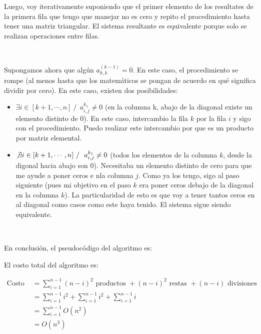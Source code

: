 \documentclass[]{article}
\begin{document}
Luego, voy iterativamente suponiendo que el primer elemento de los resultates de la primera fila que tengo que manejar no es cero y repito el procedimiento hasta tener una matriz triangular. El sistema resultante es equivalente porque solo se realizan operaciones entre filas.

~\newline

Supongamos ahora que algún $a^{(k-1)}_{k,k} = 0$. En este caso, el procedimiento se rompe (al menos hasta que los matemáticos se pongan de acuerdo en qué significa dividir por cero). En este caso, existen dos posibilidades:
\begin{itemize}
	\item $\exists i \in [k+1,\cdots,n]\ /\ \ a^{k_1}_{i,j}\neq0$ (en la columna k, abajo de la diagonal existe un elemento distinto de 0). En este caso, intercambio la fila $k$ por la fila $i$ y sigo con el procedimiento. Puedo realizar este intercambio por que es un producto por matriz elemental.

	\item $\not\exists i \in [k+1,\cdots,n]\ /\ \ a^{k_1}_{i,j}\neq0$ (todos los elementos de la columna $k$, desde la digonal hacia abajo son 0). Necesitaba un elemento distinto de cero para que me ayude a poner ceros e nla columna $j$. Como ya los tengo, sigo al paso siguiente (pues mi objetivo en el paso $k$ era poner ceros debajo de la diagonal en la columna $k$). La particularidad de esto es que voy a tener tantos ceros en al diagonal como casos como este haya tenido. El sistema sigue siendo equivalente.
\end{itemize}


~\newline

En conclusión, el pseudocódigo del algoritmo es:


El costo total del algoritmo es:
\begin{center}

\begin{align*}
	\displaystyle\text{Costo }&=  \sum_{i=1}^{n-1}(n-i)^2\text{ productos } + (n-i)^2\text{ restas } + (n-i)\text{ divisiones }\\
	&= \displaystyle\sum_{i=1}^{n-1}i^2 + \sum_{i=1}^{n-1}i^2 + \sum_{i=1}^{n-1}i\\
	&= \displaystyle\sum_{i=1}^{n-1}O(n^2)\\
	&= O(n^3)
\end{align*}
\end{center}
\end{document}
